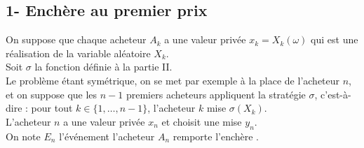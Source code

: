 \documentclass[11pt]{article}%
\begin{document}
\subsection*{1- Enchère au premier prix}

\noindent
On suppose que chaque acheteur $A_k$ a une valeur privée $x_k = 
X_k(\omega)$ qui est une réalisation de la variable aléatoire $X_k$.\\
Soit $\sigma$ la fonction définie à la partie II.\\
Le problème étant symétrique, on se met par exemple à la place de 
l'acheteur $n$, et on suppose que les $n-1$ premiers acheteurs 
appliquent la stratégie $\sigma$, c'est-à-dire : pour tout $k\in \{1, 
\ldots, n-1\}$, l'acheteur $k$ mise $\sigma(X_k)$.\\
L'acheteur $n$ a une valeur privée $x_n$ et choisit une mise $y_n$.\\
On note $E_n$ l'événement \og l'acheteur $A_n$ remporte l'enchère \fg{}.
\end{document}
